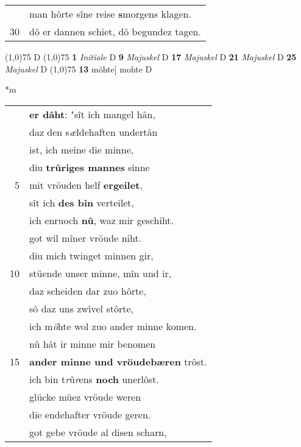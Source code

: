 \documentclass[8pt,a4paper,notitlepage]{article}
\begin{document}
\begin{table}[ht]
\begin{minipage}[t]{0.5\linewidth}
\begin{tabular}{rl}
 & man hôrte sîne reise \textbf{s}morgens klagen.\\ 
30 & dô er dannen schiet, dô begundez tagen.\\ 
\end{tabular}
\scriptsize
\line(1,0){75} \newline
D \newline
\line(1,0){75} \newline
\textbf{1} \textit{Initiale} D  \textbf{9} \textit{Majuskel} D  \textbf{17} \textit{Majuskel} D  \textbf{21} \textit{Majuskel} D  \textbf{25} \textit{Majuskel} D  \newline
\line(1,0){75} \newline
\textbf{13} möhte] mohte D \newline
\end{minipage}
\hspace{0.5cm}
\begin{minipage}[t]{0.5\linewidth}
\small
\begin{center}*m
\end{center}
\begin{tabular}{rl}
 & \textbf{er dâht}: "sît ich mangel hân,\\ 
 & daz den s\textit{æ}ldehaften undertân\\ 
 & ist, ich meine die minne,\\ 
 & diu \textbf{trûriges mannes} sinne\\ 
5 & mit vröuden helf \textbf{ergeilet},\\ 
 & sît ich \textbf{des bin} verteilet,\\ 
 & ich enruoch \textbf{nû}, waz mir geschiht.\\ 
 & got wil mîner vröude niht.\\ 
 & diu mich twinget minnen gir,\\ 
10 & stüende unser minne, mîn und ir,\\ 
 & daz scheiden dar zuo hôrte,\\ 
 & sô daz uns zwîvel stôrte,\\ 
 & ich m\textit{ö}hte wol zuo ander minne komen.\\ 
 & nû hât ir minne mir benomen\\ 
15 & \textbf{ander minne und vröudebæren} trôst.\\ 
 & ich bin t\textit{r}û\textit{r}ens \textbf{noch} unerlôst.\\ 
 & glücke müez vröude weren\\ 
 & die endehafter vröude geren.\\ 
 & got gebe vröude al disen scharn,\\ 

\end{tabular}
\end{minipage}
\end{table}
\end{document}

